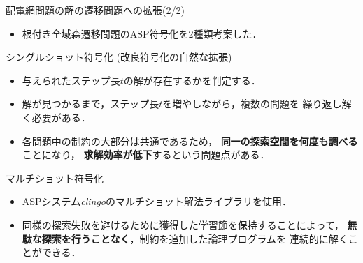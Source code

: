 \documentclass[dvipdfmx,11pt]{beamer}
\newcommand{\code}[1]{\lstinline[basicstyle=\ttfamily]{#1}}
\begin{document}
\begin{frame}{配電網問題の解の遷移問題への拡張(2/2)}
 \begin{itemize}
  \item 根付き全域森遷移問題のASP符号化を2種類考案した．
 \end{itemize}
 \begin{block}{シングルショット符号化 (改良符号化の自然な拡張)}
    \begin{itemize}
    \item 与えられたステップ長$t$の解が存在するかを判定する．
    \item 解が見つかるまで，ステップ長$t$を増やしながら，複数の問題を
      繰り返し解く必要がある．
    \item 各問題中の制約の大部分は共通であるため，
      \textbf{同一の探索空間を何度も調べる}ことになり，
      \textbf{求解効率が低下}するという問題点がある．
  \end{itemize}
 \end{block}
 \vfill
 \begin{alertblock}{マルチショット符号化}
   \begin{itemize}
   \item ASPシステム\textit{clingo}のマルチショット解法ライブラリを使用．
   \item 同様の探索失敗を避けるために獲得した学習節を保持することによって，
		 \textbf{無駄な探索を行うことなく}，制約を追加した論理プログラムを
		 連続的に解くことができる．
  \end{itemize}
 \end{alertblock}
\end{frame}
\end{document}
